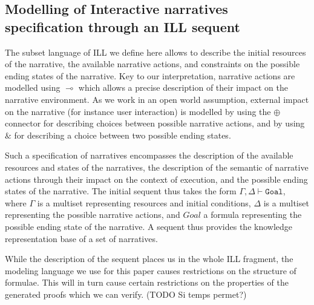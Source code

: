 \documentclass[runningheads,a4paper]{llncs}
\begin{document}
\subsection{Modelling of Interactive narratives specification through an ILL sequent\label{subsec:narrative_to_sequent}}
%
The subset language of ILL we define here allows to describe the initial resources of the narrative, the available narrative actions, and constraints on the possible ending states of the narrative. Key to our interpretation, narrative actions are modelled using $\multimap$ which allows a precise description of their impact on the narrative environment. As we work in an open world assumption, external impact on the narrative (for instance user interaction) is modelled by using the $\oplus$ connector for describing choices between possible narrative actions, and by using $\&$ for describing a choice between two possible ending states.

Such a specification of narratives encompasses the description of the available resources and states of the narratives, the description of the semantic of narrative actions through their impact on the context of execution, and the possible ending states of the narrative. The initial sequent thus takes the form $\Gamma , \Delta \vdash \mathtt{Goal}$, where $\Gamma$ is a multiset representing resources and initial conditions, $\Delta$ is a multiset representing the possible narrative actions, and $Goal$ a formula representing the possible ending state of the narrative. A sequent thus provides the knowledge representation base of a set of narratives. 

While the description of the sequent places us in the whole ILL fragment, the modeling language we use for this paper causes restrictions on the structure of formulae. This will in turn cause certain restrictions on the properties of the generated proofs which we can verify. (TODO Si temps permet?)
\end{document}
